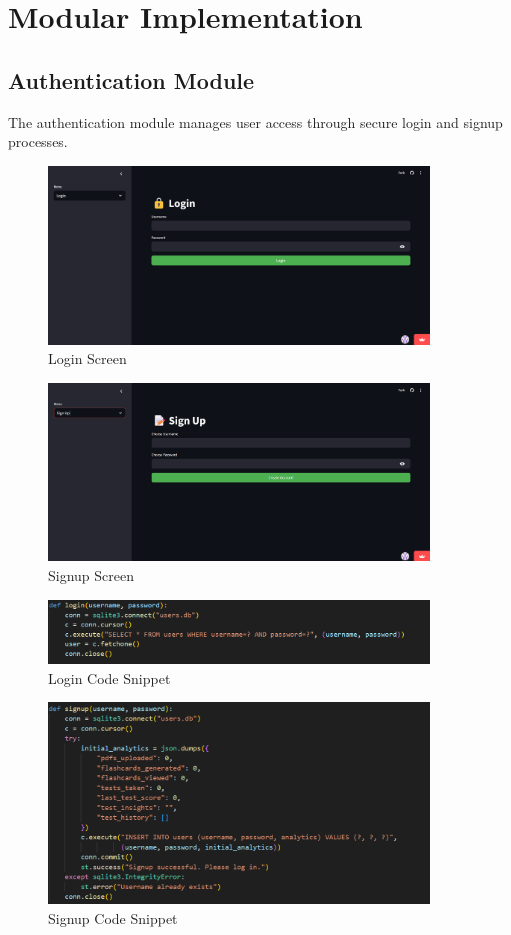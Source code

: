 \documentclass{report}
\begin{document}
\section{Modular Implementation}

\subsection{Authentication Module}
The authentication module manages user access through secure login and signup processes.
\begin{figure}[H]
\centering
\includegraphics[width=0.9\textwidth]{login.png}
\caption{Login Screen}
\end{figure}
\begin{figure}[H]
\centering
\includegraphics[width=0.9\textwidth]{signup.png}
\caption{Signup Screen}
\end{figure}
\begin{figure}[H]
\centering
\includegraphics[width=0.9\textwidth]{login-code.png}
\caption{Login Code Snippet}
\end{figure}
\begin{figure}[H]
\centering
\includegraphics[width=0.9\textwidth]{signup-code.png}
\caption{Signup Code Snippet}
\end{figure}
\end{document}
